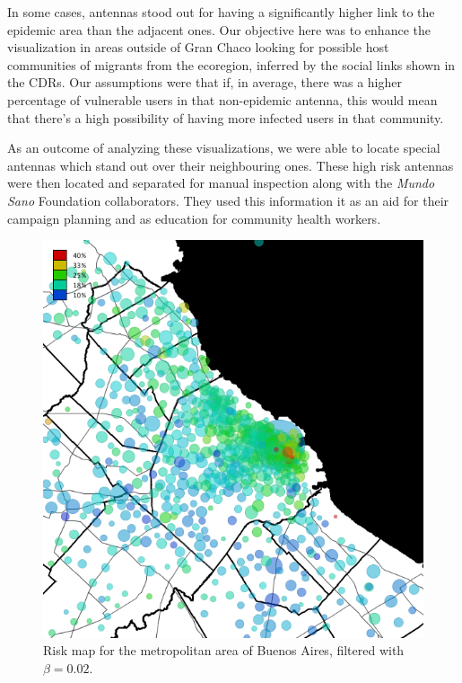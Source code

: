 In some cases, antennas stood out for having a significantly higher link to the epidemic area than the adjacent ones.
Our objective here was to enhance the visualization in areas outside of Gran Chaco looking for possible host communities of migrants from the ecoregion, inferred by the social links shown in the CDRs.
Our assumptions were that if, in average, there was a higher percentage of vulnerable users in that non-epidemic antenna, this would mean that there's a high possibility of having more infected users in that community.

As an outcome of analyzing these visualizations, we were able to locate special antennas which stand out over their neighbouring ones.
These high risk antennas were then located and separated for manual inspection along with the \textit{Mundo Sano} Foundation collaborators.
They used this information it as an aid for their campaign planning and as education for community health workers.


\begin{figure}[p]
	\caption{Risk map for the metropolitan area of Buenos Aires, filtered with $\beta = 0.02$.}\label{fig:amba_map}
	\centering
	\includegraphics[width=0.65\linewidth]
	{figures/201112_hi_res_amba_usuarios_proporcion_circulos_beta2/201112_hi_res_amba_usuarios_proporcion_circulos_beta2}
\end{figure}

